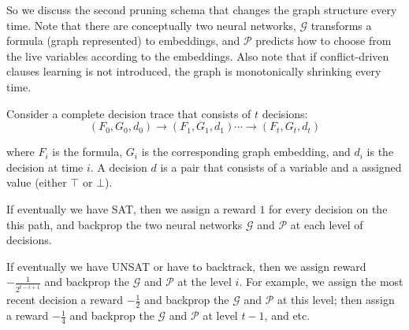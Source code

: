 \documentclass[sigplan,10pt]{acmart}\settopmatter{printfolios=true,printccs=false,printacmref=false}
\begin{document}
So we discuss the second pruning schema that changes the graph structure every time.
Note that there are conceptually two neural networks, $\mathcal{G}$ transforms a formula (graph represented) 
to embeddings, and $\mathcal{P}$ predicts how to choose from the live variables according to the embeddings.
Also note that if conflict-driven clauses learning is not introduced, 
the graph is monotonically shrinking every time.

Consider a complete decision trace that consists of $t$ decisions:
$$ (F_0, G_0, d_0) \to (F_1, G_1, d_1) \cdots \to (F_t, G_t, d_t) $$

where $F_i$ is the formula, $G_i$ is the corresponding graph embedding, and $d_i$ is the decision at time $i$.
A decision $d$ is a pair that consists of a variable and a assigned value (either $\top$ or $\bot$).

If eventually we have SAT, then we assign a reward $1$ for every decision on the this path,
and backprop the two neural networks $\mathcal{G}$ and $\mathcal{P}$ at each level of decisions.

If eventually we have UNSAT or have to backtrack, then we assign reward $-\frac{1}{2^{t-i+1}}$
and backprop the $\mathcal{G}$ and $\mathcal{P}$ at the level $i$.
For example, we assign the most recent decision a 
reward $-\frac{1}{2}$ and backprop the $\mathcal{G}$ and $\mathcal{P}$ at this level; then assign
a reward $-\frac{1}{4}$ and backprop the $\mathcal{G}$ and $\mathcal{P}$ at level $t-1$, and etc.

\clearpage{}







\end{document}
